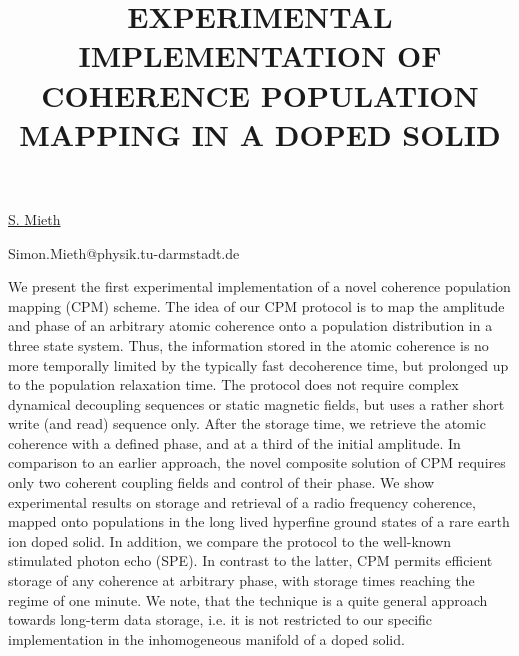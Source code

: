 \title{EXPERIMENTAL IMPLEMENTATION OF COHERENCE POPULATION MAPPING IN A DOPED SOLID}

\underline{S. Mieth} 

{\normalsize{\vspace{-4mm}
\darmstadt

\email Simon.Mieth@physik.tu-darmstadt.de}}

We present the first experimental implementation of a novel coherence population mapping (CPM) scheme. The idea of our CPM protocol is to map the amplitude and phase of an arbitrary atomic coherence onto a population distribution in a three state system. Thus, the information stored in the atomic coherence is no more temporally limited by the typically fast decoherence time, but prolonged up to the population relaxation time. The protocol does not require complex dynamical decoupling sequences or static magnetic fields, but uses a rather short write (and read) sequence only. After the storage time, we retrieve the atomic coherence with a defined phase, and at a third of the initial amplitude. In comparison to an earlier approach, the novel composite solution of CPM requires only two coherent coupling fields and control of their phase.
We show experimental results on storage and retrieval of a radio frequency coherence, mapped onto populations in the long lived hyperfine ground states of a rare earth ion doped solid. In addition, we compare the protocol to the well-known stimulated photon echo (SPE). In contrast to the latter, CPM permits efficient storage of any coherence at arbitrary phase, with storage times reaching the regime of one minute. We note, that the technique is a quite general approach towards long-term data storage, i.e. it is not restricted to our specific implementation in the inhomogeneous manifold of a doped solid.

\vspace{\baselineskip}
